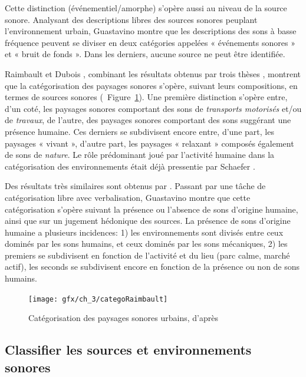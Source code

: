 Cette distinction (événementiel/amorphe) s'opère aussi au niveau de la source sonore. Analysant des descriptions libres des sources sonores peuplant l’environnement urbain, Guastavino montre que les descriptions des sons à basse fréquence peuvent se diviser en deux catégories appelées « événements sonores » et « bruit de fonds ». Dans les derniers, aucune source ne peut être identifiée.

Raimbault et Dubois \citep{raimbault2005urban}, combinant les résultats obtenus par trois thèses \citep{maffiolo_caracterisation_1999, raimbault2002simulation, guastavino_etude_2003}, montrent que la catégorisation des paysages sonores s'opère, suivant leurs compositions, en termes de sources sonores (\cf~Figure~\ref{fig:catSoundscapeRaimbault}). Une première distinction s'opère entre, d'un coté, les paysages sonores comportant des sons de \emph{transports motorisés} et/ou de \emph{travaux}, de l'autre, des paysages sonores comportant des sons suggérant une présence humaine. Ces derniers se subdivisent encore entre, d'une part, les paysages « vivant », d'autre part, les paysages « relaxant » composés également de sons de \emph{nature}. Le rôle prédominant joué par l'activité humaine dans la catégorisation des environnements était déjà pressentie par Schaefer \citep{schafer1977tuning}.

Des résultats très similaires sont obtenus par \citep{guastavino2007categorization}. Passant par une tâche de catégorisation libre avec verbalisation, Guastavino montre que cette catégorisation s'opère suivant la présence ou l'absence de sons d'origine humaine, ainsi que sur un jugement hédonique des sources. La présence de sons d'origine humaine a plusieurs incidences: 1) les environnements sont divisés entre ceux dominés par les sons humains, et ceux dominés par les sons mécaniques, 2) les premiers se subdivisent en fonction de l'activité et du lieu (parc calme, marché actif), les seconds se subdivisent encore en fonction de la présence ou non de sons humains.

\begin{figure}[t]
        \myfloatalign
        \texttt{[image: gfx/ch\_3/categoRaimbault]}
        \caption[Catégorisation des paysages sonores urbains.]{Catégorisation des paysages sonores urbains, d'après \citep{raimbault2005urban}}\label{fig:catSoundscapeRaimbault}
\end{figure}

\subsection{Classifier les sources et environnements sonores}

